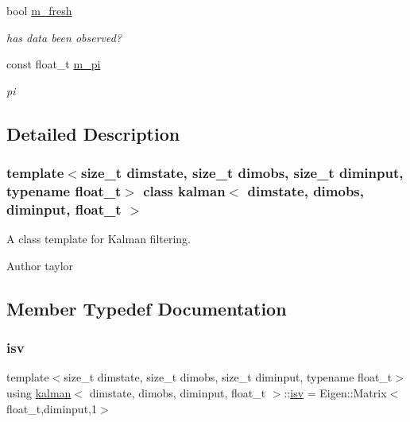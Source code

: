 \begin{DoxyCompactItemize}
\mbox{\label{classkalman_ae36bdf8e665b5ad75b10b2cb7dda9e2d}} 
bool \hyperlink{classkalman_ae36bdf8e665b5ad75b10b2cb7dda9e2d}{m\+\_\+fresh}
\begin{DoxyCompactList}\small\item\em has data been observed? \end{DoxyCompactList}\item 
\mbox{\label{classkalman_a56d4926de379c3445fcf7e3e25fc4373}} 
const float\+\_\+t \hyperlink{classkalman_a56d4926de379c3445fcf7e3e25fc4373}{m\+\_\+pi}
\begin{DoxyCompactList}\small\item\em pi \end{DoxyCompactList}\end{DoxyCompactItemize}


\subsection{Detailed Description}
\subsubsection*{template$<$size\+\_\+t dimstate, size\+\_\+t dimobs, size\+\_\+t diminput, typename float\+\_\+t$>$\newline
class kalman$<$ dimstate, dimobs, diminput, float\+\_\+t $>$}

A class template for Kalman filtering. 

\begin{DoxyAuthor}{Author}
taylor 
\end{DoxyAuthor}


\subsection{Member Typedef Documentation}
\mbox{\label{classkalman_abc570ce1b06e8a96a334f9226dfbce77}} 
\subsubsection{\texorpdfstring{isv}{isv}}
{\footnotesize\ttfamily template$<$size\+\_\+t dimstate, size\+\_\+t dimobs, size\+\_\+t diminput, typename float\+\_\+t$>$ \\
using \hyperlink{classkalman}{kalman}$<$ dimstate, dimobs, diminput, float\+\_\+t $>$\+::\hyperlink{classkalman_abc570ce1b06e8a96a334f9226dfbce77}{isv} =  Eigen\+::\+Matrix$<$float\+\_\+t,diminput,1$>$}

